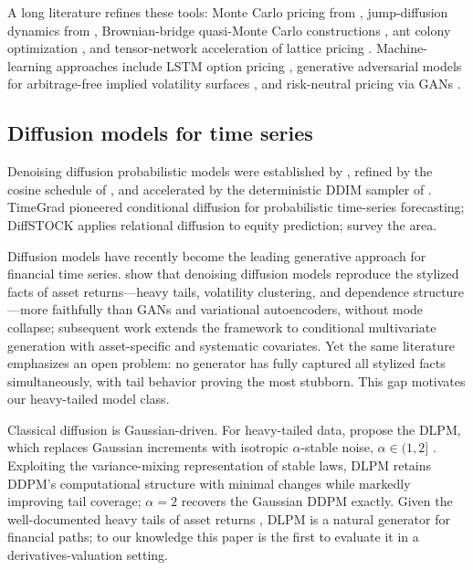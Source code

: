\documentclass[12pt,letterpaper]{article}
\begin{document}
A long literature refines these tools: Monte Carlo pricing from
\citet{boyle1977options}, jump-diffusion dynamics from
\citet{merton1976option}, Brownian-bridge quasi-Monte Carlo constructions
\citep{lin2008brownian}, ant colony optimization \citep{kumar2009aco}, and
tensor-network acceleration of lattice pricing \citep{vandamme2025tensor}.
Machine-learning approaches include LSTM option pricing
\citep{pimentel2025lstm}, generative adversarial models for arbitrage-free
implied volatility surfaces \citep{vuletic2025volgan}, and risk-neutral
pricing via GANs \citep{choi2025riskneutral}.

\subsection{Diffusion models for time series}

Denoising diffusion probabilistic models were established by
\citet{ho2020ddpm}, refined by the cosine schedule of
\citet{nichol2021improved}, and accelerated by the deterministic DDIM sampler
of \citet{song2020ddim}. TimeGrad \citep{rasul2021timegrad} pioneered
conditional diffusion for probabilistic time-series forecasting;
DiffSTOCK \citep{daiya2024diffstock} applies relational diffusion to equity
prediction; \citet{meijer2024rise} survey the area.

Diffusion models have recently become the leading generative approach for
financial time series. \citet{takahashi2025diffusion} show that denoising
diffusion models reproduce the stylized facts of asset
returns---heavy tails, volatility clustering, and dependence
structure---more faithfully than GANs and variational autoencoders, without
mode collapse; subsequent work extends the framework to conditional
multivariate generation with asset-specific and systematic covariates. Yet
the same literature emphasizes an open problem: no generator has fully
captured all stylized facts simultaneously, with tail behavior proving the
most stubborn. This gap motivates our heavy-tailed model class.

Classical diffusion is Gaussian-driven. For heavy-tailed data,
\citet{shariatian2024dlpm} propose the DLPM, which replaces Gaussian
increments with isotropic $\alpha$-stable noise, $\alpha \in (1,2]$
\citep{samorodnitsky1994stable}. Exploiting the variance-mixing
representation of stable laws, DLPM retains DDPM's computational structure
with minimal changes while markedly improving tail coverage; $\alpha = 2$
recovers the Gaussian DDPM exactly. Given the well-documented heavy tails of
asset returns \citep{cont2001empirical}, DLPM is a natural generator for
financial paths; to our knowledge this paper is the first to evaluate it in a
derivatives-valuation setting.
\end{document}
